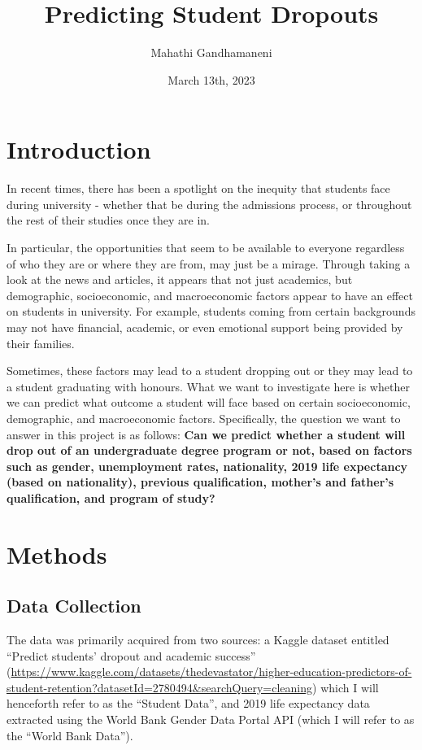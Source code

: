 \documentclass[
]{article}
\title{Predicting Student Dropouts}
\author{Mahathi Gandhamaneni}
\date{March 13th, 2023}
\begin{document}
\maketitle

\hypertarget{introduction}{%
\section{Introduction}\label{introduction}}

In recent times, there has been a spotlight on the inequity that
students face during university - whether that be during the admissions
process, or throughout the rest of their studies once they are in.

In particular, the opportunities that seem to be available to everyone
regardless of who they are or where they are from, may just be a mirage.
Through taking a look at the news and articles, it appears that not just
academics, but demographic, socioeconomic, and macroeconomic factors
appear to have an effect on students in university. For example,
students coming from certain backgrounds may not have financial,
academic, or even emotional support being provided by their families.

Sometimes, these factors may lead to a student dropping out or they may
lead to a student graduating with honours. What we want to investigate
here is whether we can predict what outcome a student will face based on
certain socioeconomic, demographic, and macroeconomic factors.
Specifically, the question we want to answer in this project is as
follows: \textbf{Can we predict whether a student will drop out of an
undergraduate degree program or not, based on factors such as gender,
unemployment rates, nationality, 2019 life expectancy (based on
nationality), previous qualification, mother's and father's
qualification, and program of study?}

\hypertarget{methods}{%
\section{Methods}\label{methods}}

\hypertarget{data-collection}{%
\subsection{Data Collection}\label{data-collection}}

The data was primarily acquired from two sources: a Kaggle dataset
entitled ``Predict students' dropout and academic success''
(\url{https://www.kaggle.com/datasets/thedevastator/higher-education-predictors-of-student-retention?datasetId=2780494\&searchQuery=cleaning})
which I will henceforth refer to as the ``Student Data'', and 2019 life
expectancy data extracted using the World Bank Gender Data Portal API
(which I will refer to as the ``World Bank Data'').
\end{document}
